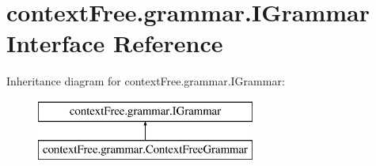 \hypertarget{interfacecontext_free_1_1grammar_1_1_i_grammar}{\section{context\-Free.\-grammar.\-I\-Grammar Interface Reference}
\label{interfacecontext_free_1_1grammar_1_1_i_grammar}
}
Inheritance diagram for context\-Free.\-grammar.\-I\-Grammar\-:\begin{figure}[H]
\begin{center}
\leavevmode
\includegraphics[height=2.000000cm]{interfacecontext_free_1_1grammar_1_1_i_grammar}
\end{center}
\end{figure}
